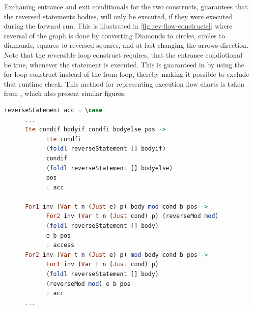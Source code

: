 Exchaning entrance and exit conditionals for the two constructs, guarantees that the reversed
statements bodies, will only be executed, if they were executed during the forward run. This
is illustrated in \autoref{fig:rev-flow-constructs}; where reversal of the graph is done
by converting Diamonds to circles, circles to diamonds, squares to reversed squares, and at
last changing the arrows direction. Note that the reversible loop construct requires, that
the entrance condiotional be true, whenever the statement is executed. This is guaranteed in
\lan by using the for-loop construct instead of the from-loop, thereby making it possible to
exclude that runtime check. This method for representing execution flow charts is taken from
\cite{pld}, which also present similar figures.

\begin{lstlisting}[language=Haskell, label={lst:stmt-reverser}, caption={Reversing for-loops and if-statements.}]
reverseStatement acc = \case
      ...
      Ite condif bodyif condfi bodyelse pos ->
            Ite condfi
            (foldl reverseStatement [] bodyif)
            condif
            (foldl reverseStatement [] bodyelse)
            pos
            : acc

      For1 inv (Var t n (Just e) p) body mod cond b pos ->
            For2 inv (Var t n (Just cond) p) (reverseMod mod)
            (foldl reverseStatement [] body)
            e b pos
            : access
      For2 inv (Var t n (Just e) p) mod body cond b pos ->
            For1 inv (Var t n (Just cond) p)
            (foldl reverseStatement [] body)
            (reverseMod mod) e b pos
            : acc
      ...
\end{lstlisting}

